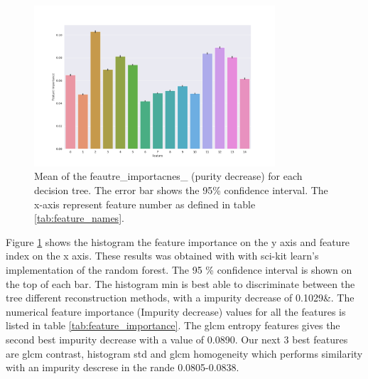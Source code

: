 

\begin{figure}[H]
    \centering
    \includegraphics[width=0.8\textwidth]{Figures/feature_importance_sklearn_3s.png}
    \caption{Mean of the feautre\_importacnes\_ (purity decrease) for each decision tree. The
    error bar shows the 95\% confidence interval. The x-axis represent feature
    number as defined in table \ref{tab:feature_names}.  }  
    \label{fig:feature_importance} 
\end{figure}


Figure \ref{fig:feature_importance} shows the histogram the feature importance
on the y axis and feature index on the x axis. These results was obtained with
with sci-kit learn's implementation of the random forest. The 95 \% confidence
interval is shown on the top of each bar. The histogram min is best able to
discriminate between the tree different reconstruction methods, with a impurity
decrease of 0.1029\&. The numerical feature importance (Impurity decrease)
values for all the features is listed in table \ref{tab:feature_importance}.
The glcm entropy features gives the second best impurity decrease with a value
of 0.0890. Our next 3 best features are glcm contrast, histogram std and glcm
homogeneity which performs similarity with an impurity descrese in the rande
0.0805-0.0838. 

